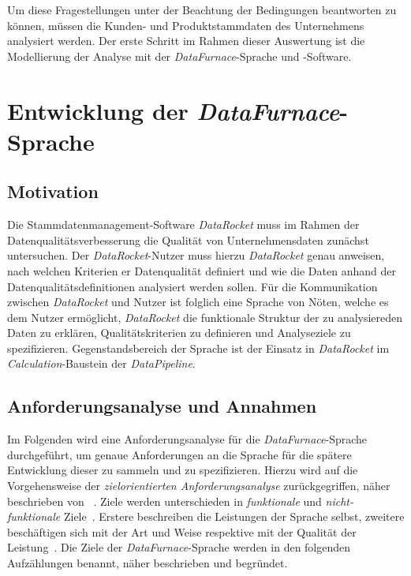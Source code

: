\documentclass[
  language=german, %
  type=bachelor%
]{isthesis}
\begin{document}
\begin{content}
  Um diese Fragestellungen unter der Beachtung der Bedingungen beantworten zu
  können, müssen die Kunden- und Produktstammdaten des Unternehmens analysiert
  werden. Der erste Schritt im Rahmen dieser Auswertung ist die Modellierung
  der Analyse \zB{} mit der \textit{DataFurnace}-Sprache und -Software.

  \chapter{Entwicklung der \textit{DataFurnace}-Sprache}\label{chapter:entwicklung-datafurnace-sprache}



  \section{Motivation}

	Die Stammdatenmanagement-Software \textit{DataRocket} muss im Rahmen der
	Datenqualitätsverbesserung die Qualität von Unternehmensdaten zunächst
	untersuchen. Der \textit{DataRocket}-Nutzer muss hierzu \textit{DataRocket}
	genau anweisen, nach welchen Kriterien er Datenqualität definiert und wie die
	Daten anhand der Datenqualitätsdefinitionen analysiert werden sollen. Für die
	Kommunikation zwischen \textit{DataRocket} und Nutzer ist folglich eine
	Sprache von Nöten, welche es dem Nutzer ermöglicht, \textit{DataRocket} die
	funktionale Struktur der zu analysiereden Daten zu erklären,
	Qualitätskriterien zu definieren und Analyseziele zu spezifizieren.
	Gegenstandsbereich der Sprache ist der Einsatz in \textit{DataRocket} im
	\textit{Calculation}-Baustein der \textit{DataPipeline}.


  \section{Anforderungsanalyse und Annahmen}\label{sec:sprache/anforderungsanalyse}

	Im Folgenden wird eine Anforderungsanalyse für die
	\textit{DataFurnace}-Sprache durchgeführt, um genaue Anforderungen an die
	Sprache für die spätere Entwicklung dieser zu sammeln und zu spezifizieren.
	Hierzu wird auf die Vorgehensweise der \textit{zielorientierten
	Anforderungsanalyse} zurückgegriffen, näher beschrieben von
	\textsc{\citeauthor{van2001goal}}~\citeyearpar{van2001goal}.  Ziele werden
	unterschieden in \textit{funktionale} und \textit{nicht-funktionale}
	Ziele~\cite[][S.  36]{mylopoulos1999object}.  Erstere beschreiben die
	Leistungen der Sprache selbst, zweitere beschäftigen sich mit der Art und
	Weise respektive mit der Qualität der Leistung~\cite[][S.  250]{van2001goal}.
	Die Ziele der \textit{DataFurnace}-Sprache werden in den folgenden
	Aufzählungen benannt, näher beschrieben und begründet.


\end{content}
\end{document}
